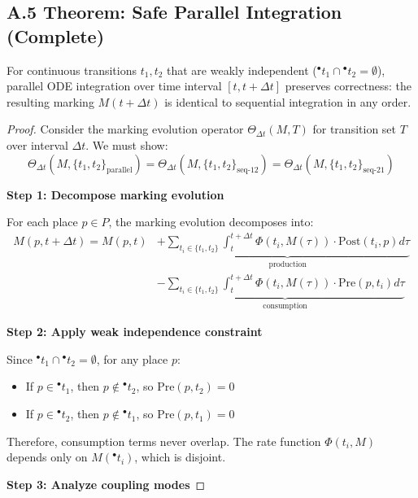 \subsection*{A.5 Theorem: Safe Parallel Integration (Complete)}

\begin{theorem}
For continuous transitions $t_1, t_2$ that are weakly independent (${}^\bullet t_1 \cap {}^\bullet t_2 = \emptyset$), parallel ODE integration over time interval $[t, t+\Delta t]$ preserves correctness: the resulting marking $M(t+\Delta t)$ is identical to sequential integration in any order.
\end{theorem}

\begin{proof}
Consider the marking evolution operator $\Theta_{\Delta t}(M, T)$ for transition set $T$ over interval $\Delta t$. We must show:
\[
\Theta_{\Delta t}(M, \{t_1, t_2\}_{\text{parallel}}) = \Theta_{\Delta t}(M, \{t_1, t_2\}_{\text{seq-12}}) = \Theta_{\Delta t}(M, \{t_1, t_2\}_{\text{seq-21}})
\]

\textbf{Step 1: Decompose marking evolution}

For each place $p \in P$, the marking evolution decomposes into:
\begin{align*}
M(p, t+\Delta t) = M(p, t) &+ \underbrace{\sum_{t_i \in \{t_1, t_2\}} \int_t^{t+\Delta t} \Phi(t_i, M(\tau)) \cdot \text{Post}(t_i, p) d\tau}_{\text{production}} \\
&- \underbrace{\sum_{t_i \in \{t_1, t_2\}} \int_t^{t+\Delta t} \Phi(t_i, M(\tau)) \cdot \text{Pre}(p, t_i) d\tau}_{\text{consumption}}
\end{align*}

\textbf{Step 2: Apply weak independence constraint}

Since ${}^\bullet t_1 \cap {}^\bullet t_2 = \emptyset$, for any place $p$:
\begin{itemize}
\item If $p \in {}^\bullet t_1$, then $p \notin {}^\bullet t_2$, so $\text{Pre}(p, t_2) = 0$
\item If $p \in {}^\bullet t_2$, then $p \notin {}^\bullet t_1$, so $\text{Pre}(p, t_1) = 0$
\end{itemize}

Therefore, consumption terms never overlap. The rate function $\Phi(t_i, M)$ depends only on $M({}^\bullet t_i)$, which is disjoint.

\textbf{Step 3: Analyze coupling modes}


\end{proof}
